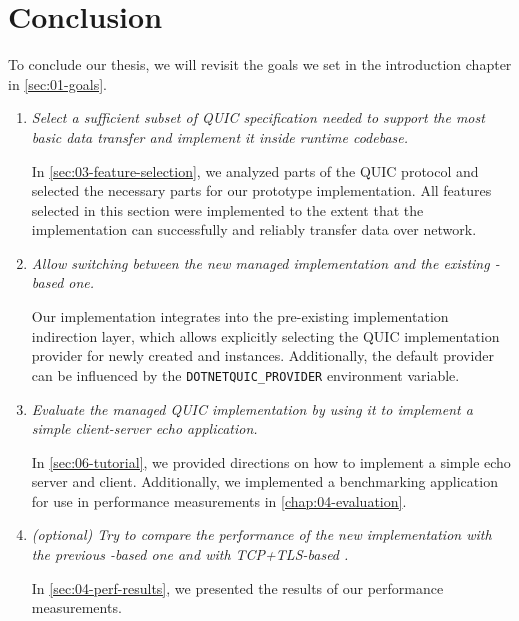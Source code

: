 \chapter*{Conclusion}

To conclude our thesis, we will revisit the goals we set in the introduction chapter in
\autoref{sec:01-goals}.

\begin{enumerate}

  \item \textit{Select a sufficient subset of QUIC specification needed to support the most basic data
        transfer and implement it inside \dotnet{} runtime codebase.}

        In \autoref{sec:03-feature-selection}, we analyzed parts of the QUIC protocol and selected
        the necessary parts for our prototype implementation. All features selected in this section
        were implemented to the extent that the implementation can successfully and reliably
        transfer data over network.

  \item \textit{Allow switching between the new managed implementation and the existing \libmsquic{}-based one.}

        Our implementation integrates into the pre-existing implementation indirection layer, which
        allows explicitly selecting the QUIC implementation provider for newly created
        \QuicListener{} and \QuicConnection{} instances. Additionally, the default provider can be
        influenced by the \texttt{DOTNETQUIC_PROVIDER} environment variable.

  \item \textit{Evaluate the managed QUIC implementation by using it to implement a simple client-server
echo application.}

        In \autoref{sec:06-tutorial}, we provided directions on how to implement a simple echo
        server and client. Additionally, we implemented a benchmarking application for use in
        performance measurements in \autoref{chap:04-evaluation}.

  \item \textit{(optional) Try to compare the performance of the new implementation with the
previous \libmsquic{}-based one and with TCP+TLS-based .}

       In \autoref{sec:04-perf-results}, we presented the results of our performance measurements.


\end{enumerate}

